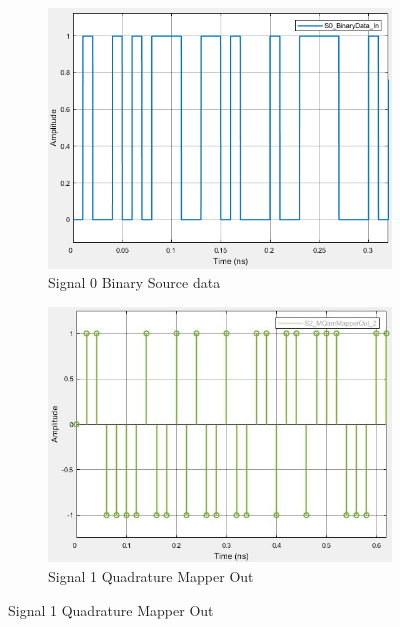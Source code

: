 \begin{figure}[H]
    \centering
    \begin{subfigure}{0.4\textwidth}
    \includegraphics[scale=0.45]{../lib/m_qam_transmitter/figures/binary_in.png}
    \caption{Signal 0 Binary Source data}
    \label{fig:data}
    \end{subfigure}
    \begin{subfigure}{0.4\textwidth}
    	\centering
    	\includegraphics[scale=0.45]{../lib/m_qam_transmitter/figures/T_diracs.png}
    	\caption{Signal 1 Quadrature Mapper Out}
    	\label{fig:diracs}
	\end{subfigure}
\end{figure}
